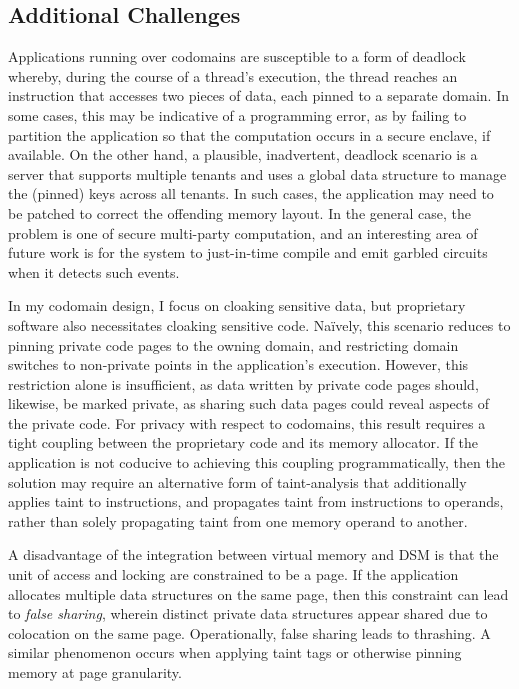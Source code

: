 \subsection{Additional Challenges}
\label{sec:codomains-challenges}

%
Applications running over codomains are susceptible to a form of deadlock
whereby, during the course of a thread's execution, the thread reaches an
instruction that accesses two pieces of data, each pinned to a separate domain.
%
In some cases, this may be indicative of a programming error, as by failing to
partition the application so that the computation occurs in a secure enclave,
if available.
%
On the other hand, a plausible, inadvertent, deadlock scenario is a server that
supports multiple tenants and uses a global data structure to manage the
(pinned) keys across all tenants.
%
In such cases, the application may need to be patched to correct the offending
memory layout.
%
In the general case, the problem is one of secure multi-party computation, and
an interesting area of future work is for the system to just-in-time compile
and emit garbled circuits when it detects such events.


%
In my codomain design, I focus on cloaking sensitive data, but proprietary
software also necessitates cloaking sensitive code.
%
Na\"{i}vely, this scenario reduces to pinning private code pages to the owning
domain, and restricting domain switches to non-private points in the
application's execution.
%
However, this restriction alone is insufficient, as data written by private
code pages should, likewise, be marked private, as sharing such data pages
could reveal aspects of the private code.
%
For privacy with respect to codomains, this result requires a tight coupling
between the proprietary code and its memory allocator.
%
If the application is not coducive to achieving this coupling programmatically,
then the solution may require an alternative form of taint-analysis that
additionally applies taint to instructions, and propagates taint from
instructions to operands, rather than solely propagating taint from one memory
operand to another.


%
A disadvantage of the integration between virtual memory and DSM is that the
unit of access and locking are constrained to be a page.
%
If the application allocates multiple data structures on the same page, then
this constraint can lead to \emph{false sharing}, wherein distinct private data
structures appear shared due to colocation on the same page.
%
Operationally, false sharing leads to thrashing.
%
A similar phenomenon occurs when applying taint tags or otherwise pinning
memory at page granularity.



